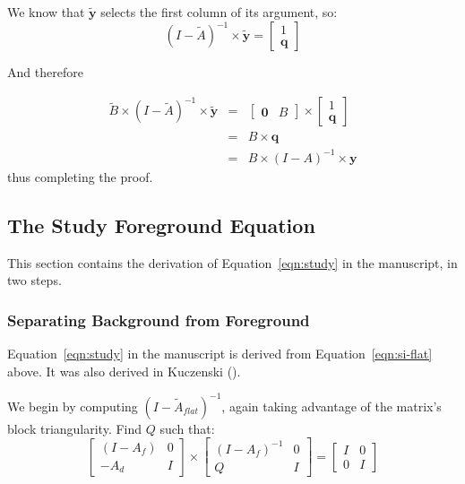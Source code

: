 We know that $\tilde{\mathbf{y}}$ selects the first column of its argument, so:
\begin{equation}
  (I-\tilde{A})^{-1}\times\tilde{\mathbf{y}} = \left[\begin{array}{c}
      1\\
      \mathbf{q}
    \end{array}\right]
\end{equation}

And therefore

\begin{eqnarray}
  \tilde{B}\times(I-\tilde{A})^{-1}\times\tilde{\mathbf{y}} &=& \left[\begin{array}{cc}\mathbf{0}&B\end{array}\right]\times\left[\begin{array}{c}
      1\\
      \mathbf{q}
    \end{array}\right]\\
   &=&B\times\mathbf{q}\\
   &=&B\times(I-A)^{-1}\times\mathbf{y}
\end{eqnarray}
thus completing the proof.

\subsection{The Study Foreground Equation}

This section contains the derivation of Equation~\ref{eqn:study} in the manuscript, in two steps.



\subsubsection{Separating Background from Foreground}
  
Equation~\ref{eqn:study} in the manuscript is derived from Equation~\ref{eqn:si-flat} above.  It was also derived in Kuczenski (\citeyear{Kuczenski_JLCA_2015}).

We begin by computing $(I-\tilde{A}_{flat})^{-1}$, again taking advantage of the matrix's block triangularity.  Find $Q$ such that:
\begin{equation}
  \left[\begin{array}{cc} (I-A_f) & 0 \\ -A_d & I\end{array}\right]\times
  \left[\begin{array}{cc} (I-A_f)^{-1} & 0 \\ Q & I\end{array}\right] =
  \left[\begin{array}{cc} I & 0 \\ 0 & I\end{array}\right]
\end{equation}

